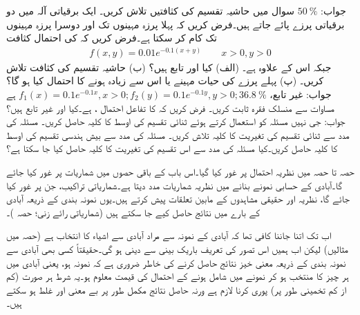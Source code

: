 جواب:\quad
$\SI{50}{\percent}$
\quad
سوال  میں حاشیہ تقسیم کی کثافتیں تلاش کریں۔
\quad
ایک برقیاتی آلہ میں دو برقیاتی پرزے پائے جاتے ہیں۔فرض کریں کہ پہلا پرزہ  مہینوں تک اور دوسرا پرزہ  مہینوں تک کام کر سکتا ہے۔فرض کریں کہ  کی احتمال کثافت
\begin{align*}
f(x,y)=0.01e^{-0.1(x+y)}\quad\quad x>0,y>0
\end{align*}
جبکہ اس کے علاوہ  ہے۔ (الف) کیا  اور  تابع ہیں؟ (ب) حاشیہ تقسیم کی کثافت تلاش کریں۔ (پ) پہلے پرزے کی حیات  مہینے یا اس سے زیادہ ہونے کا احتمال کیا ہو گا؟\\
جواب:\quad
غیر تابع،  
$f_1(x)=0.1e^{-0.1x}, x>0; f_2(y)=0.1e^{-0.1y}, y>0; \SI{36.8}{\percent}$
ہے
\quad
مساوات  سے منسلک فقرہ ثابت کریں۔
\quad
فرض کریں کہ  کا تفاعل احتمال ،  ہے۔کیا  اور  غیر تابع ہیں؟\\
جواب: جی نہیں
\quad
مسئلہ  کو استعمال کرتے ہوئے ثنائی تقسیم کی اوسط  کا کلیہ  حاصل کریں۔
\quad
مسئلہ  کی مدد سے ثنائی تقسیم کی تغیریت  کا کلیہ تلاش کریں۔
\quad
مسئلہ   کی مدد سے  بیش ہندسی تقسیم کی اوسط کا کلیہ  حاصل کریں۔کیا  مسئلہ  کی مدد سے اس تقسیم کی تغیریت کا کلیہ حاصل کیا جا سکتا ہے؟

حصہ  تا حصہ  میں نظریہ احتمال پر غور کیا گیا۔اس باب کے باقی حصوں میں شماریات پر غور کیا جائے گا۔آبادی کے حسابی نمونے بنانے میں نظریہ شماریات مدد دیتا ہے۔شماریاتی تراکیب، جن پر غور کیا جائے گا،  نظریہ اور  حقیقی مشاہدوں  کے مابین تعلقات پیش کرتے ہیں۔یوں نمونہ بندی کے ذریعہ آبادی کے بارے میں نتائج حاصل کیے جا سکتے ہیں (شماریاتی رائے زنی؛ حصہ )۔

اب تک اتنا جاننا کافی تھا کہ آبادی کے نمونہ سے مراد آبادی سے اشیاء کا انتخاب ہے (حصہ  میں مثالیں) لیکن اب ہمیں اس تصور کی تعریف باریک بینی سے دینی ہو گی۔حقیقتاً کسی بھی آبادی سے نمونہ بندی کے ذریعہ معنی خیز نتائج حاصل کرنے کی خاطر ضروری ہے کہ نمونہ  ہو، یعنی آبادی میں ہر چیز کا  منتخب ہو کر نمونے میں شامل ہونے  کے احتمال کی قیمت معلوم ہو۔یہ شرط ہر صورت (کم از کم تخمینی طور پر) پوری کرنا لازم ہے ورنہ حاصل نتائج مکمل طور پر بے معنی اور غلط ہو سکتے ہیں۔


